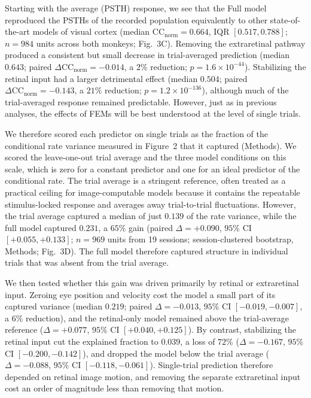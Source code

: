\documentclass{lite}
\begin{document}
Starting with the average (PSTH) response, we see that the Full model reproduced the PSTHs of the recorded population equivalently to other state-of-the-art models of visual cortex \cite{wang2025foundation} (median $\mathrm{CC}_{\mathrm{norm}} = 0.664$, IQR $[0.517, 0.788]$; $n = 984$ units across both monkeys; Fig.~3C). Removing the extraretinal pathway produced a consistent but small decrease in trial-averaged prediction (median $0.643$; paired $\Delta \mathrm{CC}_{\mathrm{norm}} = -0.014$, a $2\%$ reduction; $p = 1.6\times10^{-44}$). Stabilizing the retinal input had a larger detrimental effect (median $0.504$; paired $\Delta \mathrm{CC}_{\mathrm{norm}} = -0.143$, a $21\%$ reduction; $p = 1.2\times10^{-136}$), although much of the trial-averaged response remained predictable. However, just as in previous analyses, the effects of FEMs will be best understood at the level of single trials.

We therefore scored each predictor on single trials as the fraction of the conditional rate variance measured in Figure~2 that it captured (Methods). We scored the leave-one-out trial average and the three model conditions on this scale, which is zero for a constant predictor and one for an ideal predictor of the conditional rate. The trial average is a stringent reference, often treated as a practical ceiling for image-computable models because it contains the repeatable stimulus-locked response and averages away trial-to-trial fluctuations. However, the trial average captured a median of just $0.139$ of the rate variance, while the full model captured $0.231$, a $65\%$ gain (paired $\Delta = +0.090$, $95\%$ CI $[+0.055, +0.133]$; $n = 969$ units from 19 sessions; session-clustered bootstrap, Methods; Fig.~3D). The full model therefore captured structure in individual trials that was absent from the trial average.

We then tested whether this gain was driven primarily by retinal or extraretinal input. Zeroing eye position and velocity cost the model a small part of its captured variance (median $0.219$; paired $\Delta = -0.013$, $95\%$ CI $[-0.019, -0.007]$, a $6\%$ reduction), and the retinal-only model remained above the trial-average reference ($\Delta = +0.077$, $95\%$ CI $[+0.040, +0.125]$). By contrast, stabilizing the retinal input cut the explained fraction to $0.039$, a loss of $72\%$ ($\Delta = -0.167$, $95\%$ CI $[-0.200, -0.142]$), and dropped the model below the trial average ($\Delta = -0.088$, $95\%$ CI $[-0.118, -0.061]$). Single-trial prediction therefore depended on retinal image motion, and removing the separate extraretinal input cost an order of magnitude less than removing that motion.
\end{document}
